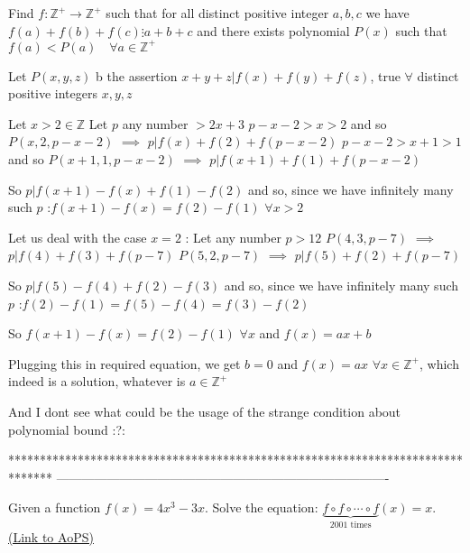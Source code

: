 \begin{solution}
	\begin{tcolorbox}Find $f:\mathbb{Z}^{+} \to \mathbb{Z}^{+}$ such that for all distinct positive integer $a,b,c$ we have $f(a)+f(b)+f(c) \vdots a+b+c$ and there exists polynomial $P(x)$ such that $f(a)<P(a) \quad  \forall a \in \mathbb{Z}^{+}$\end{tcolorbox}
Let $P(x,y,z)$ b the assertion $x+y+z|f(x)+f(y)+f(z)$, true $\forall$ distinct positive integers $x,y,z$

Let $x> 2\in\mathbb Z$
Let $p$ any number $>2x+3$
$p-x-2>x>2$ and so $P(x,2,p-x-2)$ $\implies$ $p|f(x)+f(2)+f(p-x-2)$
$p-x-2>x+1>1$ and so $P(x+1,1,p-x-2)$ $\implies$ $p|f(x+1)+f(1)+f(p-x-2)$

So $p|f(x+1)-f(x)+f(1)-f(2)$ and so, since we have infinitely many such $p$ :$f(x+1)-f(x)=f(2)-f(1)$ $\forall x>2$

Let us deal with the case $x=2$ :
Let any number $p>12$ 
$P(4,3,p-7)$ $\implies$ $p|f(4)+f(3)+f(p-7)$
$P(5,2,p-7)$ $\implies$ $p|f(5)+f(2)+f(p-7)$

So $p|f(5)-f(4)+f(2)-f(3)$ and so, since we have infinitely many such $p$ :$f(2)-f(1)=f(5)-f(4)=f(3)-f(2)$ 

So $f(x+1)-f(x)=f(2)-f(1)$ $\forall x$ and $f(x)=ax+b$

Plugging this in required equation, we get $b=0$ and $\boxed{f(x)=ax}$ $\forall x\in\mathbb Z^+$, which indeed is a solution, whatever is $a\in\mathbb Z^+$

And I dont see what could be the usage of the strange condition about polynomial bound :?:
\end{solution}
*******************************************************************************
-------------------------------------------------------------------------------

\begin{problem}
	Given a function $f(x)=4x^3-3x$. Solve the equation: $ \underbrace{f{\circ}f{\circ}\cdots{\circ}f}_{2001\textrm{ times}}(x)=x $.
	\flushright \href{https://artofproblemsolving.com/community/c6h564061}{(Link to AoPS)}
\end{problem}



